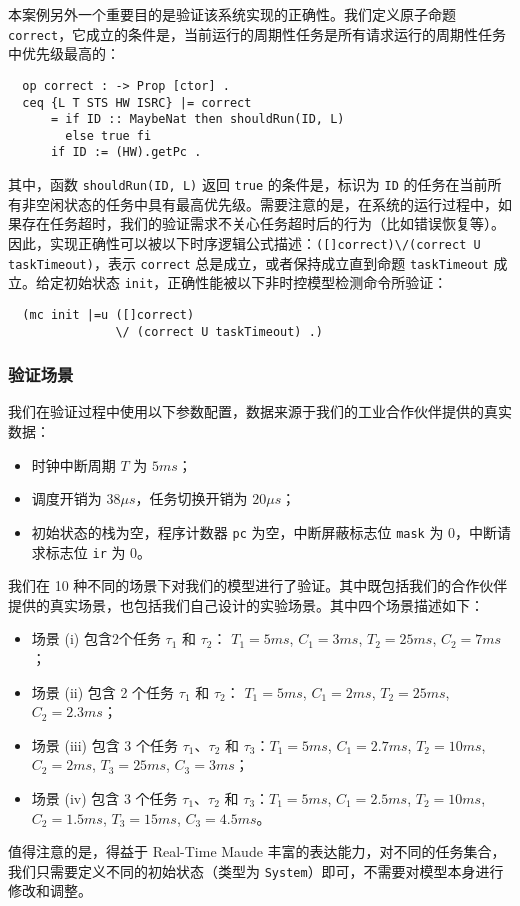 本案例另外一个重要目的是验证该系统实现的正确性。我们定义原子命题 \verb|correct|，它成立的条件是，当前运行的周期性任务是所有请求运行的周期性任务中优先级最高的：
\begin{verbatim}
  op correct : -> Prop [ctor] .
  ceq {L T STS HW ISRC} |= correct
      = if ID :: MaybeNat then shouldRun(ID, L)
        else true fi
      if ID := (HW).getPc .
\end{verbatim}
其中，函数 \verb|shouldRun(ID, L)| 返回 \verb|true| 的条件是，标识为 \verb|ID| 的任务在当前所有非空闲状态的任务中具有最高优先级。需要注意的是，在系统的运行过程中，如果存在任务超时，我们的验证需求不关心任务超时后的行为（比如错误恢复等）。因此，实现正确性可以被以下时序逻辑公式描述：\verb|([]correct)\/(correct U taskTimeout)|，表示 \verb|correct| 总是成立，或者保持成立直到命题 \verb|taskTimeout| 成立。给定初始状态 \verb|init|，正确性能被以下非时控模型检测命令所验证：
\begin{verbatim} 
  (mc init |=u ([]correct) 
               \/ (correct U taskTimeout) .)
\end{verbatim}

\subsubsection{验证场景}
\label{ss:results} 
我们在验证过程中使用以下参数配置，数据来源于我们的工业合作伙伴提供的真实数据：
\begin{itemize}
\item 时钟中断周期 $T$ 为 $5ms$；
\item 调度开销为 $38{\mu}s$，任务切换开销为 $20{\mu}s$；
\item 初始状态的栈为空，程序计数器 \verb|pc| 为空，中断屏蔽标志位 \verb|mask| 为 0，中断请求标志位 \verb|ir| 为 0。
\end{itemize}

我们在 10 种不同的场景下对我们的模型进行了验证。其中既包括我们的合作伙伴提供的真实场景，也包括我们自己设计的实验场景。其中四个场景描述如下：
\begin{itemize}
\item 场景 (i) 包含2个任务 $\tau_1$ 和 $\tau_2$： $T_1=5ms$, $C_1=3ms$, $T_2=25ms$, $C_2=7ms$；
\item 场景 (ii) 包含 2 个任务 $\tau_1$ 和 $\tau_2$： $T_1=5ms$, $C_1=2ms$, $T_2=25ms$, $C_2=2.3ms$；
\item 场景 (iii) 包含 3 个任务 $\tau_1$、$\tau_2$ 和 $\tau_3$：$T_1=5ms$, $C_1=2.7ms$, $T_2=10ms$, $C_2=2ms$, $T_3=25ms$, $C_3=3ms$；
\item 场景 (iv) 包含 3 个任务 $\tau_1$、$\tau_2$ 和 $\tau_3$：$T_1=5ms$, $C_1=2.5ms$, $T_2=10ms$, $C_2=1.5ms$, $T_3=15ms$, $C_3=4.5ms$。
\end{itemize}
值得注意的是，得益于 Real-Time Maude 丰富的表达能力，对不同的任务集合，我们只需要定义不同的初始状态（类型为 \verb|System|）即可，不需要对模型本身进行修改和调整。

